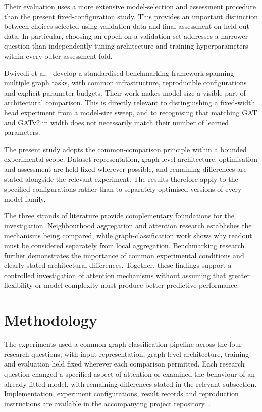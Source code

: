 \documentclass[11pt,a4paper]{article}
\begin{document}
Their evaluation uses a more extensive model-selection and assessment procedure than the present fixed-configuration study. This provides an important distinction between choices selected using validation data and final assessment on held-out data. In particular, choosing an epoch on a validation set addresses a narrower question than independently tuning architecture and training hyperparameters within every outer assessment fold.

Dwivedi et al.~\cite{dwivedi2023benchmarking} develop a standardised benchmarking framework spanning multiple graph tasks, with common infrastructure, reproducible configurations and explicit parameter budgets. Their work makes model size a visible part of architectural comparison. This is directly relevant to distinguishing a fixed-width head experiment from a model-size sweep, and to recognising that matching GAT and GATv2 in width does not necessarily match their number of learned parameters.

The present study adopts the common-comparison principle within a bounded experimental scope. Dataset representation, graph-level architecture, optimisation and assessment are held fixed wherever possible, and remaining differences are stated alongside the relevant experiment. The results therefore apply to the specified configurations rather than to separately optimised versions of every model family.

The three strands of literature provide complementary foundations for the investigation. Neighbourhood aggregation and attention research establishes the mechanisms being compared, while graph-classification work shows why readout must be considered separately from local aggregation. Benchmarking research further demonstrates the importance of common experimental conditions and clearly stated architectural differences. Together, these findings support a controlled investigation of attention mechanisms without assuming that greater flexibility or model complexity must produce better predictive performance.

\clearpage
\section{Methodology}
\label{sec:methodology}

The experiments used a common graph-classification pipeline across the four research questions, with input representation, graph-level architecture, training and evaluation held fixed wherever each comparison permitted. Each research question changed a specified aspect of attention or examined the behaviour of an already fitted model, with remaining differences stated in the relevant subsection. Implementation, experiment configurations, result records and reproduction instructions are available in the accompanying project repository~\cite{infinityrepo}.
\end{document}

